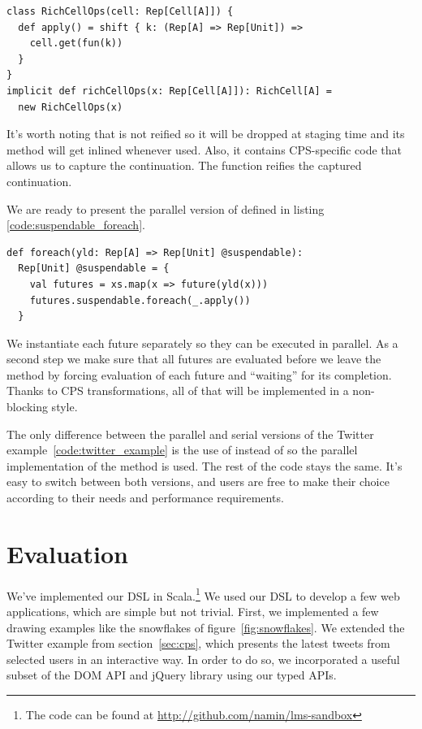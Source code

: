 \documentclass[runningheads,a4paper]{llncs}
\begin{document}
\begin{lstlisting}
class RichCellOps(cell: Rep[Cell[A]]) {
  def apply() = shift { k: (Rep[A] => Rep[Unit]) =>
    cell.get(fun(k))
  }
}
implicit def richCellOps(x: Rep[Cell[A]]): RichCell[A] =
  new RichCellOps(x)
\end{lstlisting}

It's worth noting that  is not reified so it will be dropped at staging time and its method will get inlined whenever used. Also, it contains CPS-specific code that allows us to capture the continuation. The  function reifies the captured continuation.

We are ready to present the parallel version of  defined in listing \ref{code:suspendable_foreach}.

\begin{lstlisting}
def foreach(yld: Rep[A] => Rep[Unit] @suspendable):
  Rep[Unit] @suspendable = {
    val futures = xs.map(x => future(yld(x)))
    futures.suspendable.foreach(_.apply())
  }
\end{lstlisting}

We instantiate each future separately so they can be executed in parallel. As a second step we make sure that all futures are evaluated before we leave the  method by forcing evaluation of each future and ``waiting'' for its completion. Thanks to CPS transformations, all of that will be implemented in a non-blocking style.

The only difference between the parallel and serial versions of the Twitter example~\ref{code:twitter_example} is the use of  instead of  so the parallel implementation of the  method is used. The rest of the code stays the same. It's easy to switch between both versions, and users are free to make their choice according to their needs and performance requirements.



\section{Evaluation}\label{sec:eval}

We've implemented our DSL in Scala.\footnote{The code can be found at
  \url{http://github.com/namin/lms-sandbox}} We used our DSL to
develop a few web applications, which are simple but not
trivial. First, we implemented a few drawing examples like the
snowflakes of figure~\ref{fig:snowflakes}. We extended the Twitter
example from section~\ref{sec:cps}, which presents the latest tweets
from selected users in an interactive way. In order to do so, we
incorporated a useful subset of the DOM API and jQuery library using our
typed APIs.
\end{document}
